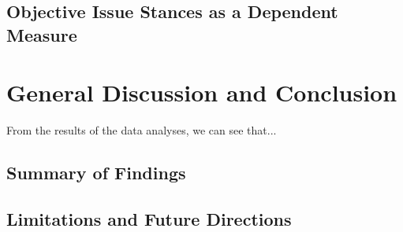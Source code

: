 \documentclass[12pt, titlepage]{article}
\begin{document}
\subsection{Objective Issue Stances as a Dependent Measure}



\section{General Discussion and Conclusion}

From the results of the data analyses, we can see that...

\subsection{Summary of Findings}


\subsection{Limitations and Future Directions}

\clearpage


\let\svaddcontentsline\addcontentsline
\renewcommand\addcontentsline[3]{%
	\ifthenelse{\equal{#1}{lof}}{}%
	{\ifthenelse{\equal{#1}{lot}}{}{\svaddcontentsline{#1}{#2}{#3}}}}


\appendixtitleon
\appendixtitletocon
\end{document}
